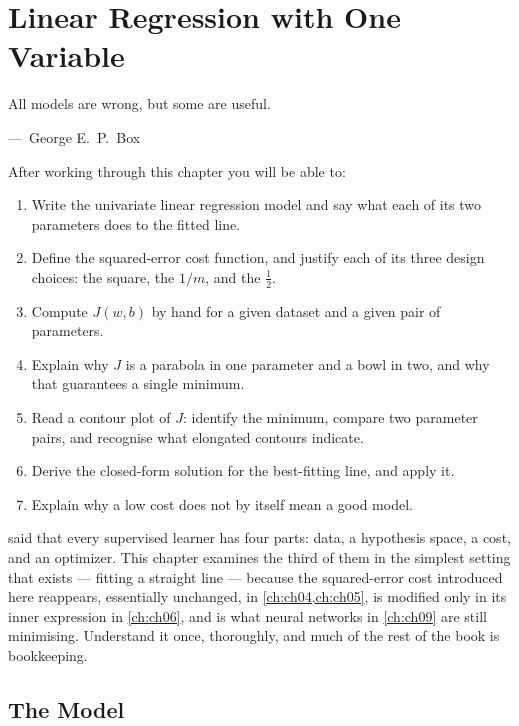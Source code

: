 
\chapter{Linear Regression with One Variable}
\label{ch:ch02}

\epigraph{All models are wrong, but some are useful.}{---\ George E.\ P.\ Box}

\begin{chapterlearning}
After working through this chapter you will be able to:
\begin{enumerate}
  \item Write the univariate linear regression model and say what each of its
        two parameters does to the fitted line.
  \item Define the squared-error cost function, and justify each of its three
        design choices: the square, the $1/m$, and the $\tfrac12$.
  \item Compute $J(w,b)$ by hand for a given dataset and a given pair of
        parameters.
  \item Explain why $J$ is a parabola in one parameter and a bowl in two, and
        why that guarantees a single minimum.
  \item Read a contour plot of $J$: identify the minimum, compare two parameter
        pairs, and recognise what elongated contours indicate.
  \item Derive the closed-form solution for the best-fitting line, and apply it.
  \item Explain why a low cost does not by itself mean a good model.
\end{enumerate}
\end{chapterlearning}

 said that every supervised learner has four parts: data, a
hypothesis space, a cost, and an optimizer. This chapter examines the third of
them in the simplest setting that exists --- fitting a straight line ---
because the squared-error cost introduced here reappears, essentially unchanged,
in \cref{ch:ch04,ch:ch05}, is modified only in its inner expression in
\cref{ch:ch06}, and is what neural networks in \cref{ch:ch09} are still
minimising. Understand it once, thoroughly, and much of the rest of the book is
bookkeeping.

\section{The Model}
\label{sec:the-model}

